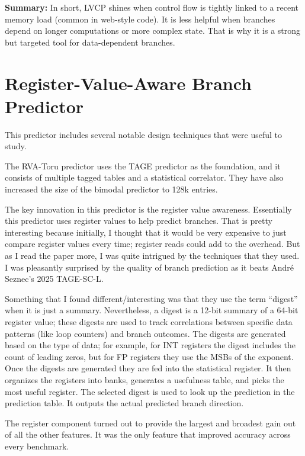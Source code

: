 \documentclass[11pt,a4paper]{article}
\begin{document}
\textbf{Summary:} In short, LVCP shines when control flow is tightly linked to a recent memory load (common in web-style code). It is less helpful when branches depend on longer computations or more complex state. That is why it is a strong but targeted tool for data-dependent branches.

\newpage

\section{Register-Value-Aware Branch Predictor}

This predictor includes several notable design techniques that were useful to study.

The RVA-Toru predictor uses the TAGE predictor as the foundation, and it consists of multiple tagged tables and a statistical correlator. They have also increased the size of the bimodal predictor to 128k entries.

The key innovation in this predictor is the register value awareness. Essentially this predictor uses register values to help predict branches. That is pretty interesting because initially, I thought that it would be very expensive to just compare register values every time; register reads could add to the overhead. But as I read the paper more, I was quite intrigued by the techniques that they used. I was pleasantly surprised by the quality of branch prediction as it beats André Seznec's 2025 TAGE-SC-L.

Something that I found different/interesting was that they use the term ``digest'' when it is just a summary. Nevertheless, a digest is a 12-bit summary of a 64-bit register value; these digests are used to track correlations between specific data patterns (like loop counters) and branch outcomes. The digests are generated based on the type of data; for example, for INT registers the digest includes the count of leading zeros, but for FP registers they use the MSBs of the exponent. Once the digests are generated they are fed into the statistical register. It then organizes the registers into banks, generates a usefulness table, and picks the most useful register. The selected digest is used to look up the prediction in the prediction table. It outputs the actual predicted branch direction.

The register component turned out to provide the largest and broadest gain out of all the other features. It was the only feature that improved accuracy across every benchmark.
\end{document}
